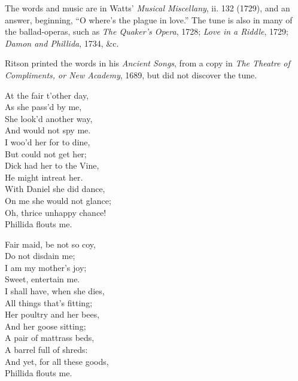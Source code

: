 The words and music are in Watts’ \textit{Musical Miscellany}, ii. 132 (1729), and an
answer, beginning, “O where’s the plague in love.” The tune is also in many of
the ballad-operas, such as \textit{The Quaker’s Opera}, 1728; \textit{Love in a Riddle}, 1729;
\textit{Damon and Phillida}, 1734, \&c.

Ritson printed the words in his \textit{Ancient Songs}, from a copy in \textit{The Theatre of
Compliments, or New Academy}, 1689, but did not discover the tune.




\settowidth{\versewidth}{Thou shalt eat curds ond cream}
\begin{dcverse}\begin{patverse}
At the fair t’other day,\\
As she pass’d by me,\\
She look’d another way,\\
And would not spy me.\\
I woo’d her for to dine,\\
But could not get her;\\
Dick had her to the Vine,\\
He might intreat her.\\
With Daniel she did dance,\\
On me she would not glance;\\
Oh, thrice unhappy chance!\\
Phillida flouts me.
\end{patverse}

\begin{patverse}
Fair maid, be not so coy,\\
Do not disdain me;\\
I am my mother’s joy;\\
Sweet, entertain me.\\
I shall have, when she dies,\\
All things that’s fitting;\\
Her poultry and her bees,\\
And her goose sitting;\\
A pair of mattrass beds,\\
A barrel full of shreds:\\
And yet, for all these goods,\\
Phillida flouts me.
\end{patverse}


\end{dcverse}
